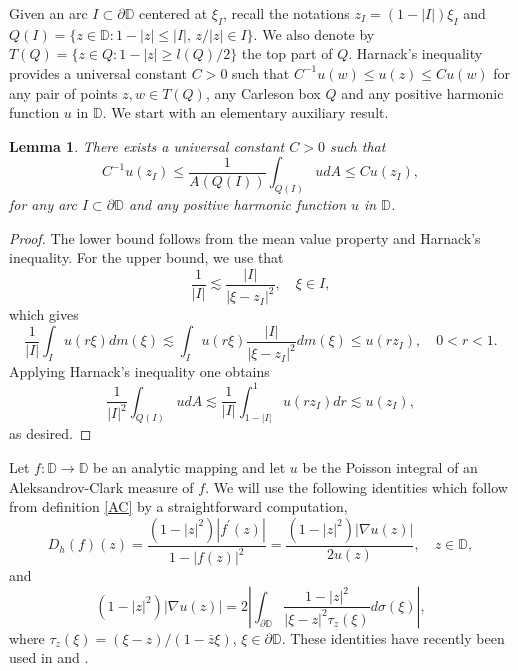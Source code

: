 \documentclass[a4paper,12pt]{article}
\newtheorem{lem}{Lemma}[section]
\theoremstyle{definition}
\numberwithin{equation}{section}
\newcommand{\D}{\mathbb D}
\begin{document}
Given an arc $I \subset \partial \D$ centered at $\xi_I$, recall the notations $z_I = (1- |I|)\xi_I$ and $Q(I)= \{z \in \D: 1-|z| \leq |I|, \, z/|z| \in I \}$. We also denote by $T(Q) = \{z \in Q: 1- |z| \geq l(Q) /2 \}$ the top part of $Q$. Harnack's inequality provides a universal constant $C>0$ such that $C^{-1} u(w) \leq u(z) \leq C u(w)$ for any pair of points $z,w \in T(Q)$, any Carleson box $Q$ and any positive harmonic function $u$ in $\D$. We start with an elementary auxiliary result. 

\begin{lem}
    \label{meanvalue}
There exists a universal constant $C>0$ such that 
$$
C^{-1} u \left(z_{I}\right) \leqslant \frac{1}{A(Q(I))} \int_{Q(I)} u d A \leqslant C u\left(z_{I}\right), 
$$
for any arc $I \subset \partial \mathbb{D}$ and any positive harmonic function $u$ in $\mathbb{D}$. 
    
\end{lem}

\begin{proof}
 The lower bound follows 
from the mean value property and Harnack's inequality. 
For the upper bound, we use that
$$
\frac{1}{|I|} \lesssim  \frac{|I|}{\left|\xi-z_{I}\right|^{2}} , \quad  \xi \in I ,
$$
which gives
$$
\frac{1}{|I|} \int_{I} u(r \xi) dm (\xi) \lesssim \int_{I} u( r \xi) \frac{|I|}{\left|\xi-z_{I}\right|^{2}} d m(\xi) \leq u\left(r z_{I}\right), \quad  0<r<1 .
$$
Applying Harnack's inequality one obtains
$$
\frac{1}{|I|^{2}} \int_{Q(I)} u d A \lesssim \frac{1}{|I|} \int_{1-|I|}^{1} u\left(r z_{I}\right) d r \lesssim u\left(z_{I}\right), 
$$
as desired.
\end{proof}

Let $f:\D \rightarrow \D$ be an analytic mapping and let $u$ be the Poisson integral of an Aleksandrov-Clark measure of $f$. We will use the following identities which follow from definition \eqref{AC} by a straightforward computation,
\begin{equation}
    \label{tag1}
    D_h (f) (z) = \frac{\left(1-|z|^{2}\right)\left|f^{\prime}(z)\right|}{1-|f(z)|^{2}}=\frac{\left(1-|z|^2 \right) |\nabla u(z)|}{2 u(z)}, \quad z \in \mathbb{D} ,
\end{equation}
and
\begin{equation}
    \label{tag2}
    \left(1-|z|^{2}\right)|\nabla u(z)|=2 \left|\int_{\partial \mathbb{D}} \frac{1-|z|^{2}}{|\xi-z|^{2} \tau_z (\xi)}  d \sigma (\xi) \right|, 
\end{equation}
where $\tau_z(\xi) = (\xi -z)/(1-\bar{z} \xi)$, $\xi \in \partial \D$. These identities have recently been used in \cite{APHA} and \cite{ivriinicolau2025}. 
\end{document}
